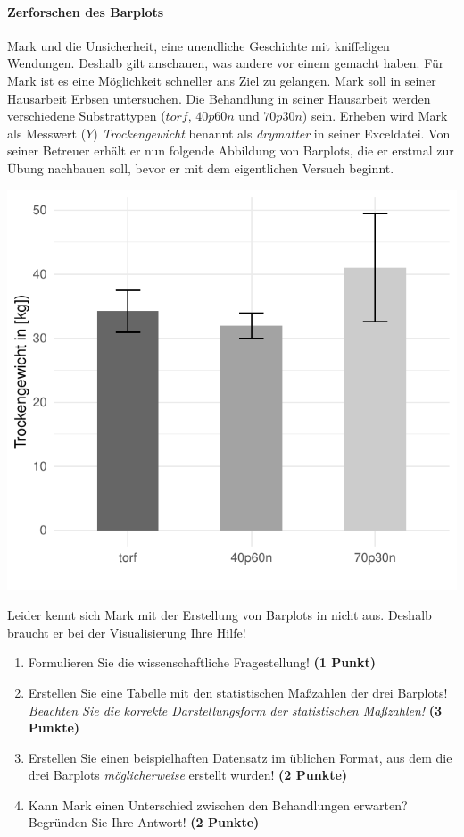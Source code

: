 \documentclass[a4paper, 9pt]{scrartcl}\usepackage[]{graphicx}\usepackage[]{xcolor}
\makeatletter
\def\maxwidth{ %
  \ifdim\Gin@nat@width>\linewidth
    \linewidth
  \else
    \Gin@nat@width
  \fi
}
\makeatother
\begin{document}
\paragraph{Zerforschen des Barplots}

Mark und die Unsicherheit, eine unendliche Geschichte mit kniffeligen Wendungen. Deshalb gilt anschauen, was andere vor einem gemacht haben. Für Mark ist es eine Möglichkeit schneller ans Ziel zu gelangen. Mark soll in seiner Hausarbeit Erbsen untersuchen. Die Behandlung in seiner Hausarbeit werden verschiedene Substrattypen ($torf$, $40p60n$ und $70p30n$) sein. Erheben wird Mark als Messwert ($Y$) \textit{Trockengewicht} benannt als \textit{drymatter} in seiner Exceldatei. Von seiner Betreuer erhält er nun folgende Abbildung von Barplots, die er erstmal zur Übung nachbauen soll, bevor er mit dem eigentlichen Versuch beginnt.



{\centering \includegraphics[width=\maxwidth]{img/barplot-02-1} 

}




Leider kennt sich Mark mit der Erstellung von Barplots in \Rlogo nicht aus. Deshalb braucht er bei der Visualisierung Ihre Hilfe!

\begin{enumerate}
\item Formulieren Sie die wissenschaftliche Fragestellung! \textbf{(1 Punkt)}
\item Erstellen Sie eine Tabelle mit den statistischen Maßzahlen der drei Barplots! \textit{Beachten Sie die korrekte Darstellungsform der statistischen Maßzahlen!} \textbf{(3 Punkte)}
\item Erstellen Sie einen beispielhaften Datensatz im \Rlogo üblichen Format, aus dem die drei Barplots \textit{möglicherweise} erstellt wurden! \textbf{(2 Punkte)}
\item Kann Mark einen Unterschied zwischen den Behandlungen erwarten? Begründen Sie Ihre Antwort! \textbf{(2 Punkte)}
\end{enumerate} 
\clearpage
\end{document}
